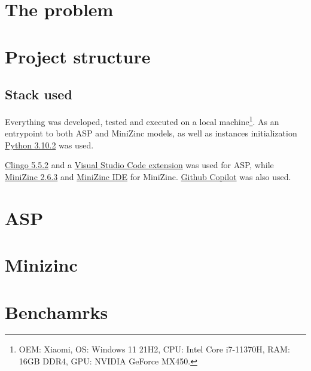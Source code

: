 \section{The problem}

\section{Project structure}

\subsection{Stack used}

Everything was developed, tested and executed on a local machine\footnote{OEM: Xiaomi, OS: Windows 11 21H2, CPU: Intel Core i7-11370H, RAM: 16GB DDR4, GPU: NVIDIA GeForce MX450.}. As an entrypoint to both ASP and MiniZinc models, as well as instances initialization \href{https://www.python.org/downloads/release/python-3102/}{Python 3.10.2} was used.

\href{https://github.com/potassco/clingo/releases/tag/v5.5.2}{Clingo 5.5.2} and a \href{https://marketplace.visualstudio.com/items?itemName=abelcour.asp-syntax-highlight}{Visual Studio Code extension} was used for ASP, while \href{https://github.com/MiniZinc/libminizinc/releases/tag/2.6.3}{MiniZinc 2.6.3} and \href{https://www.minizinc.org/ide/}{MiniZinc IDE} for MiniZinc. \href{https://copilot.github.com/}{Github Copilot} was also used.



\section{ASP}

\section{Minizinc}

\section{Benchamrks}